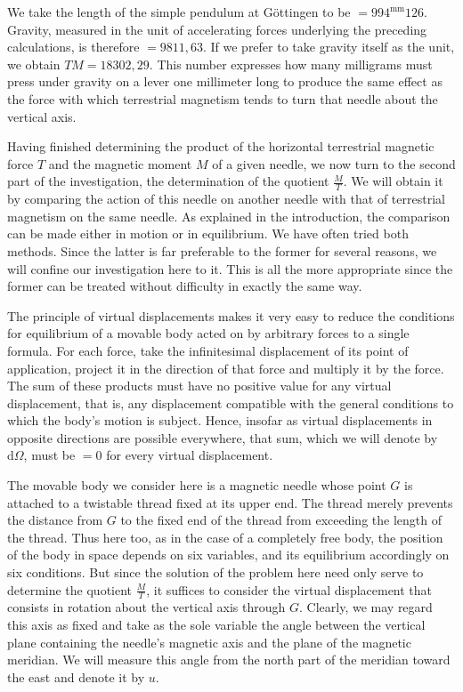 We take the length of the simple pendulum at Göttingen to be $=994^{\mathrm{mm}}126$. Gravity, measured in the unit of accelerating forces underlying the preceding calculations, is therefore $=9811{,}63$. If we prefer to take gravity itself as the unit, we obtain $TM=18302{,}29$. This number expresses how many milligrams must press under gravity on a lever one millimeter long to produce the same effect as the force with which terrestrial magnetism tends to turn that needle about the vertical axis.

Having finished determining the product of the horizontal terrestrial magnetic force $T$ and the magnetic moment $M$ of a given needle, we now turn to the second part of the investigation, the determination of the quotient $\frac MT$. We will obtain it by comparing the action of this needle on another needle with that of terrestrial magnetism on the same needle. As explained in the introduction, the comparison can be made either in motion or in equilibrium. We have often tried both methods. Since the latter is far preferable to the former for several reasons, we will confine our investigation here to it. This is all the more appropriate since the former can be treated without difficulty in exactly the same way.

The principle of virtual displacements makes it very easy to reduce the conditions for equilibrium of a movable body acted on by arbitrary forces to a single formula. For each force, take the infinitesimal displacement of its point of application, project it in the direction of that force and multiply it by the force. The sum of these products must have no positive value for any virtual displacement, that is, any displacement compatible with the general conditions to which the body's motion is subject. Hence, insofar as virtual displacements in opposite directions are possible everywhere, that sum, which we will denote by $\mathrm{d}\Omega$, must be $=0$ for every virtual displacement.

The movable body we consider here is a magnetic needle whose point $G$ is attached to a twistable thread fixed at its upper end. The thread merely prevents the distance from $G$ to the fixed end of the thread from exceeding the length of the thread. Thus here too, as in the case of a completely free body, the position of the body in space depends on six variables, and its equilibrium accordingly on six conditions. But since the solution of the problem here need only serve to determine the quotient $\frac MT$, it suffices to consider the virtual displacement that consists in rotation about the vertical axis through $G$. Clearly, we may regard this axis as fixed and take as the sole variable the angle between the vertical plane containing the needle's magnetic axis and the plane of the magnetic meridian. We will measure this angle from the north part of the meridian toward the east and denote it by $u$.

